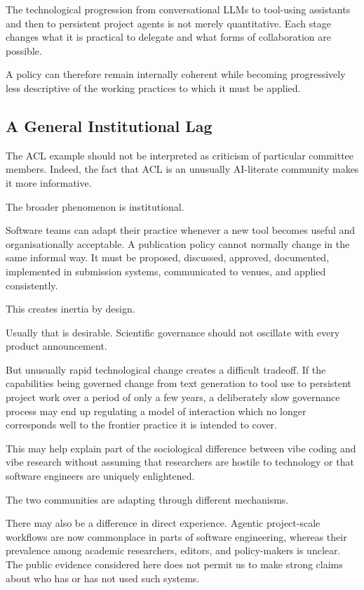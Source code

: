 \documentclass[12pt]{article}
\begin{document}
The technological progression from conversational LLMs to tool-using assistants and then to persistent project agents is not merely quantitative. Each stage changes what it is practical to delegate and what forms of collaboration are possible.

A policy can therefore remain internally coherent while becoming progressively less descriptive of the working practices to which it must be applied.


\subsection{A General Institutional Lag}

The ACL example should not be interpreted as criticism of particular committee members. Indeed, the fact that ACL is an unusually AI-literate community makes it more informative.

The broader phenomenon is institutional.

Software teams can adapt their practice whenever a new tool becomes useful and organisationally acceptable. A publication policy cannot normally change in the same informal way. It must be proposed, discussed, approved, documented, implemented in submission systems, communicated to venues, and applied consistently.

This creates inertia by design.

Usually that is desirable. Scientific governance should not oscillate with every product announcement.

But unusually rapid technological change creates a difficult tradeoff. If the capabilities being governed change from text generation to tool use to persistent project work over a period of only a few years, a deliberately slow governance process may end up regulating a model of interaction which no longer corresponds well to the frontier practice it is intended to cover.

This may help explain part of the sociological difference between vibe coding and vibe research without assuming that researchers are hostile to technology or that software engineers are uniquely enlightened.

The two communities are adapting through different mechanisms.

There may also be a difference in direct experience. Agentic project-scale workflows are now commonplace in parts of software engineering, whereas their prevalence among academic researchers, editors, and policy-makers is unclear. The public evidence considered here does not permit us to make strong claims about who has or has not used such systems.
\end{document}
